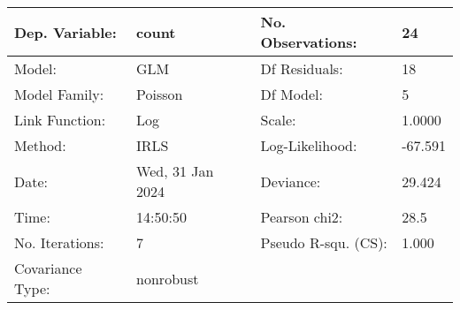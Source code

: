 \begin{tabular}{llll}
\toprule
Dep. Variable: & count &   No. Observations:   &     24 \\
\midrule
Model: & GLM &   Df Residuals:       &     18 \\
Model Family: & Poisson &   Df Model:           &      5 \\
Link Function: & Log &   Scale:              &   1.0000 \\
Method: & IRLS &   Log-Likelihood:     &  -67.591 \\
Date: & Wed, 31 Jan 2024 &   Deviance:           &   29.424 \\
Time: & 14:50:50 &   Pearson chi2:       &   28.5 \\
No. Iterations: & 7 &   Pseudo R-squ. (CS): &  1.000 \\
Covariance Type: & nonrobust &                       &   \\
\bottomrule
\end{tabular}
